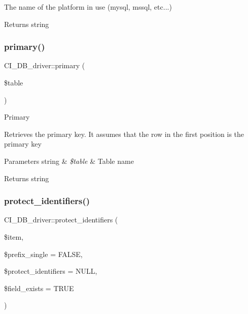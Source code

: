 The name of the platform in use (mysql, mssql, etc...)

\begin{DoxyReturn}{Returns}
string 
\end{DoxyReturn}
\mbox{\label{class_c_i___d_b__driver_aa7f9521b7da36b0801cba09e82786c7b}} 
\subsubsection{\texorpdfstring{primary()}{primary()}}
{\footnotesize\ttfamily C\+I\+\_\+\+D\+B\+\_\+driver\+::primary (\begin{DoxyParamCaption}\item[{}]{\$table }\end{DoxyParamCaption})}

Primary

Retrieves the primary key. It assumes that the row in the first position is the primary key


\begin{DoxyParams}[1]{Parameters}
string & {\em \$table} & Table name \\
\hline
\end{DoxyParams}
\begin{DoxyReturn}{Returns}
string 
\end{DoxyReturn}
\mbox{\label{class_c_i___d_b__driver_ada7e8a59334d3badca419b84f4123036}} 
\subsubsection{\texorpdfstring{protect\+\_\+identifiers()}{protect\_identifiers()}}
{\footnotesize\ttfamily C\+I\+\_\+\+D\+B\+\_\+driver\+::protect\+\_\+identifiers (\begin{DoxyParamCaption}\item[{}]{\$item,  }\item[{}]{\$prefix\+\_\+single = {\ttfamily FALSE},  }\item[{}]{\$protect\+\_\+identifiers = {\ttfamily NULL},  }\item[{}]{\$field\+\_\+exists = {\ttfamily TRUE} }\end{DoxyParamCaption})}

